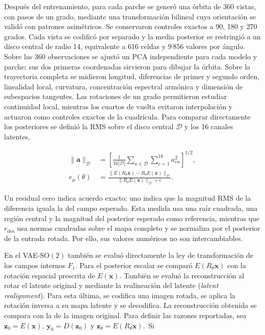 \begingroup{}
Después del entrenamiento, para cada parche se generó una órbita de 360 vistas, con pasos de un
grado, mediante una transformación bilineal cuya orientación se validó con
patrones asimétricos. Se conservaron controles exactos a 90, 180 y 270 grados.
Cada vista se codificó por separado y la media posterior se restringió a un
disco central de radio 14, equivalente a 616 celdas y 9\,856 valores por
ángulo. Sobre las 360 observaciones se ajustó un PCA independiente para cada
modelo y parche; sus dos primeras coordenadas sirvieron para dibujar la órbita. Sobre la trayectoria completa se
midieron longitud, diferencias de primer y segundo orden, linealidad local,
curvatura, concentración espectral armónica y dimensión de subespacios
tangentes. Las rotaciones de un grado permitieron estudiar continuidad local,
mientras los cuartos de vuelta evitaron interpolación y actuaron como controles
exactos de la cuadrícula. Para comparar directamente los posteriores se definió
la RMS sobre el disco central \(\mathcal D\) y los 16 canales latentes,
\par\endgroup

\begin{equation}
\begin{aligned}
    \lVert\mathbf a\rVert_{\mathcal D}
      &=\left[\frac{1}{16|\mathcal D|}
        \sum_{u\in\mathcal D}\sum_{c=1}^{16}a_{cu}^2\right]^{1/2},\\
    e_\mu(\theta)
      &=\frac{\lVert E(R_\theta\mathbf x)-R_\theta E(\mathbf x)
          \rVert_{\mathcal D}}
        {\lVert R_\theta E(\mathbf x)\rVert_{\mathcal D}+\epsilon}.
\end{aligned}
    \label{eq:residual-directo-posterior}
\end{equation}

Un residual cero indica acuerdo exacto; uno indica que la magnitud RMS de la
diferencia iguala la del campo esperado. Esta medida usa una raíz cuadrada,
una región central y la magnitud del posterior esperado como referencia,
mientras que \(r_{\mathrm{des}}\) usa normas cuadradas sobre el mapa completo
y se normaliza por el posterior de la entrada rotada. Por ello, sus valores
numéricos no son intercambiables.

En el VAE-\(\mathrm{SO}(2)\) también se evaluó directamente la ley de
transformación de los campos internos \(F_1\). Para el posterior escalar se
comparó \(E(R_\theta\mathbf{x})\) con la rotación espacial prescrita de
\(E(\mathbf{x})\).
También se evaluó la reconstrucción al rotar el latente original y mediante la
realineación del latente (\emph{latent realignment}). Para esta última, se
codifica una imagen rotada, se aplica la rotación inversa a su mapa latente y
se decodifica. La reconstrucción obtenida se compara con la de la imagen
original. Para definir las razones reportadas, sea
\(\mathbf z_0=E(\mathbf x)\), \(\mathbf y_0=D(\mathbf z_0)\) y
\(\mathbf z_\theta=E(R_\theta\mathbf x)\).~Si

